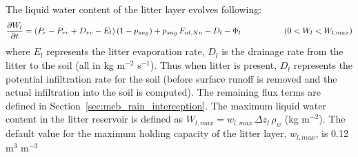 The liquid water content of the litter layer evolves following:
%
\begin{equation}
 \frac{\partial W_{l}}{\partial t} =  \left(P_r - P_{rv} + D_{rv} -
   E_l\right)\left( 1 - p_{sng}\right) +  p_{sng}\, F_{nl,Nn}
 -D_l -  \Phi_{l}  
\hskip.7in
\left(0<W_{l}<W_{l,max}\right)
\end{equation}
%
where 
$E_l$ represents the litter evaporation rate, $D_l$ is
the drainage rate from the litter to the soil 
(all in kg m$^{-2}$ s$^{-1}$).
Thus when litter is present, $D_l$ represents the potential
infiltration rate for the soil (before surface runoff is removed and
the actual infiltration into the soil is computed).
%
The remaining flux terms are defined in Section~\ref{sec:meb_rain_interception}.
%
The
maximum liquid water content in the litter reservoir is defined as
$W_{l,max}=w_{l,max}\, \Delta z_l \,\rho_w$ (kg m$^{-2}$).
The default value 
for the maximum holding capacity of the litter layer, $w_{l,max}$, is 0.12
m$^{3}$ m$^{-3}$ 
